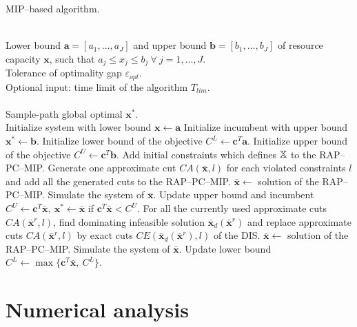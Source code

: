 \documentclass[]{interact}
\theoremstyle{plain}%
\theoremstyle{definition}
\theoremstyle{remark}
\begin{document}
\begin{algorithm}[h]
	\label{algo:}
	\caption{MIP--based algorithm.}
	\begin{algorithmic}[1]
		\REQUIRE ~~\\
		Lower bound $\mathbf{a}=[a_1,...,a_J]$ and upper bound $\mathbf{b}=[b_1,...,b_J]$ of resource capacity $\mathbf{x}$, such that $a_j\le x_j\le b_j\ \forall\ j=1,...,J$. \\
		Tolerance of optimality gap $\varepsilon_{opt}$.\\
		Optional input: time limit of the algorithm $T_{lim}$.\\
		\ENSURE ~~\\
		Sample-path global optimal $\mathbf{x}^*$.\\
		\STATE Initialize system with lower bound $\mathbf{x}\leftarrow\mathbf{a}$
		\STATE Initialize incumbent with upper bound $\mathbf{x}^*\leftarrow\mathbf{b}$. 
		\STATE Initialize lower bound of the objective $C^{L}\leftarrow\mathbf{c}^T\mathbf{a}$.
		\STATE Initialize upper bound of the objective $C^{U}\leftarrow\mathbf{c}^T\mathbf{b}$.
		\STATE Add initial constraints which defines $\Bbb{X}$ to the RAP--PC--MIP.
		\STATE Generate one approximate cut $CA(\bar{\mathbf{x}},l)$ for each violated constraints $l$ and add all the generated cuts to the RAP--PC--MIP.
		\STATE $\bar{\mathbf{x}}\leftarrow$ solution of the RAP--PC--MIP.
		\STATE Simulate the system of $\bar{\mathbf{x}}$.
		\ENDWHILE
		\STATE Update upper bound and incumbent $C^{U}\leftarrow\mathbf{c}^T\bar{\mathbf{x}},\ \mathbf{x}^*\leftarrow \bar{\mathbf{x}}$ if $\mathbf{c}^T\bar{\mathbf{x}}< C^{U}$.
		\STATE For all the currently used approximate cuts $CA(\bar{\mathbf{x}}^r,l)$, find dominating infeasible solution $\bar{\mathbf{x}}_d(\bar{\mathbf{x}}^r)$ and replace approximate cuts $CA(\bar{\mathbf{x}}^r,l)$ by exact cuts $CE(\bar{\mathbf{x}}_d(\bar{\mathbf{x}}^r),l)$ of the DIS.
		\STATE $\bar{\mathbf{x}}\leftarrow$ solution of the RAP--PC--MIP.
		\STATE Simulate the system of $\bar{\mathbf{x}}$.
		\STATE Update lower bound $C^L\leftarrow \max\{\mathbf{c}^T\bar{\mathbf{x}},\ C^L\}$.
		\ENDIF	
		\ENDWHILE
	\end{algorithmic}
\end{algorithm}


\section{Numerical analysis}
\end{document}
